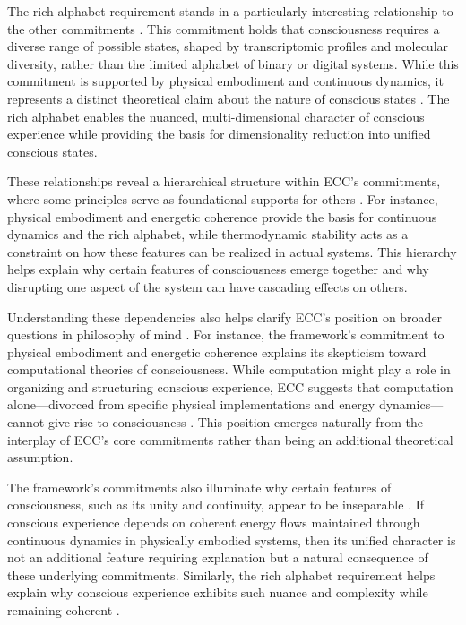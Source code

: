 The rich alphabet requirement stands in a particularly interesting relationship to the other commitments \cite{hurley1998consciousness}. This commitment holds that consciousness requires a diverse range of possible states, shaped by transcriptomic profiles and molecular diversity, rather than the limited alphabet of binary or digital systems. While this commitment is supported by physical embodiment and continuous dynamics, it represents a distinct theoretical claim about the nature of conscious states \cite{haugeland1993mind}. The rich alphabet enables the nuanced, multi-dimensional character of conscious experience while providing the basis for dimensionality reduction into unified conscious states.

These relationships reveal a hierarchical structure within ECC's commitments, where some principles serve as foundational supports for others \cite{kirchhoff2019extended}. For instance, physical embodiment and energetic coherence provide the basis for continuous dynamics and the rich alphabet, while thermodynamic stability acts as a constraint on how these features can be realized in actual systems. This hierarchy helps explain why certain features of consciousness emerge together and why disrupting one aspect of the system can have cascading effects on others.

Understanding these dependencies also helps clarify ECC's position on broader questions in philosophy of mind \cite{clark2013whatever}. For instance, the framework's commitment to physical embodiment and energetic coherence explains its skepticism toward computational theories of consciousness. While computation might play a role in organizing and structuring conscious experience, ECC suggests that computation alone—divorced from specific physical implementations and energy dynamics—cannot give rise to consciousness \cite{varela1991embodied}. This position emerges naturally from the interplay of ECC's core commitments rather than being an additional theoretical assumption.

The framework's commitments also illuminate why certain features of consciousness, such as its unity and continuity, appear to be inseparable \cite{thompson2007mind}. If conscious experience depends on coherent energy flows maintained through continuous dynamics in physically embodied systems, then its unified character is not an additional feature requiring explanation but a natural consequence of these underlying commitments. Similarly, the rich alphabet requirement helps explain why conscious experience exhibits such nuance and complexity while remaining coherent \cite{di2017sensorimotor}.

